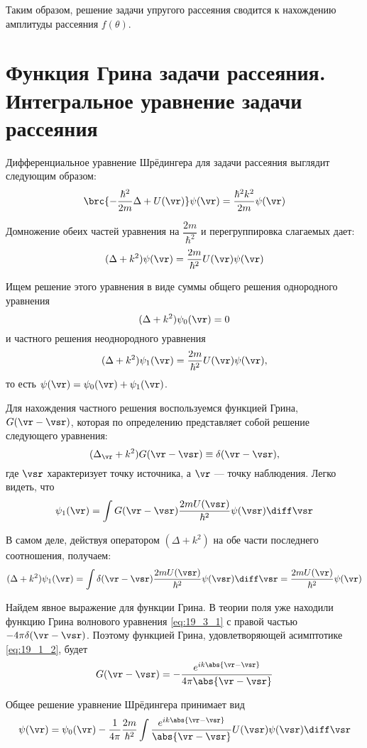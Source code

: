 Таким образом, решение задачи упругого рассеяния сводится к нахождению амплитуды рассеяния $f(\theta)$.

\section{Функция Грина задачи рассеяния. Интегральное уравнение задачи рассеяния}

Дифференциальное уравнение Шрёдингера для задачи рассеяния выглядит следующим образом:
$$
\brc{-\frac{\hbar^2}{2m} \Delta + U(\vr)}\psi(\vr) = \frac{\hbar^2 k^2}{2m} \psi(\vr)
$$

Домножение обеих частей уравнения на $\dfrac{2m}{\hbar^2}$ и перегруппировка слагаемых дает:
$$
(\Delta + k^2) \psi(\vr) = \frac{2m}{\hbar^2}U(\vr)\psi(\vr)
$$

Ищем решение этого уравнения в виде суммы общего решения однородного уравнения
$$
(\Delta + k^2) \psi_0(\vr) = 0
$$
и частного решения неоднородного уравнения
$$
(\Delta + k^2) \psi_1(\vr) = \frac{2m}{\hbar^2}U(\vr)\psi(\vr),
$$
то есть $\psi(\vr)=\psi_0(\vr) + \psi_1(\vr)$.

Для нахождения частного решения воспользуемся функцией Грина\footnotemark, ${G(\vr-\vsr)}$, которая по определению представляет собой решение следующего уравнения:
%
\begin{equation}
\label{eq:19_3_1}
(\Delta_{\vr} + k^2)G(\vr - \vsr) \equiv \delta(\vr - \vsr),
\end{equation}
где $\vsr$ характеризует точку источника, а $\vr$ --- точку наблюдения. Легко видеть, что
$$
\psi_1(\vr) = \int G(\vr - \vsr) \frac{2m U(\vsr)}{\hbar^2} \psi(\vsr) \diff\vsr
$$

В самом деле, действуя оператором $(\Delta + k^2)$ на обе части последнего соотношения, получаем:
$$
(\Delta + k^2) \psi_1(\vr) = \int \delta(\vr - \vsr) \frac{2m U(\vsr)}{\hbar^2} \psi(\vsr) \diff\vsr = \frac{2m U(\vr)}{\hbar^2} \psi(\vr)
$$

Найдем явное выражение для функции Грина. В теории поля уже находили функцию Грина волнового уравнения \eqref{eq:19_3_1} с правой частью $-4\pi \delta(\vr - \vsr)$. Поэтому функцией Грина, удовлетворяющей асимптотике \eqref{eq:19_1_2}, будет
$$
G(\vr - \vsr) = - \frac{e^{ik\abs{\vr - \vsr}}}{4\pi\abs{\vr - \vsr}}
$$

Общее решение уравнение Шрёдингера принимает вид
$$
\psi(\vr) = \psi_0(\vr) - \frac{1}{4 \pi}\frac{2m}{\hbar^2}\int \frac{e^{ik\abs{\vr - \vsr}}}{\abs{\vr - \vsr}} U(\vsr)\psi(\vsr)\diff\vsr
$$

